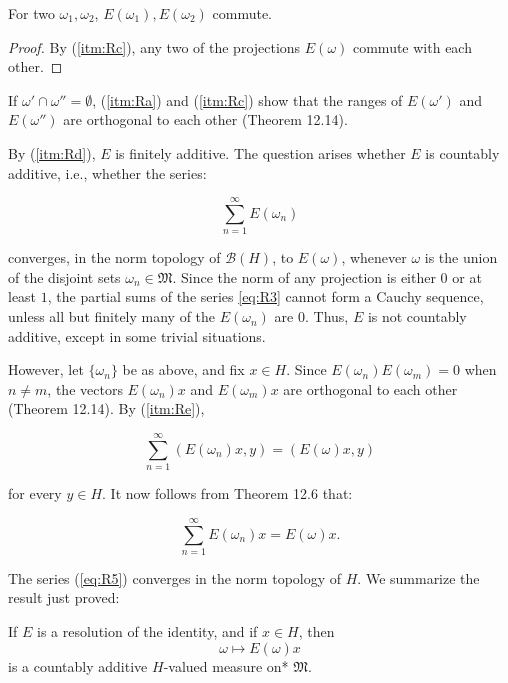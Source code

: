 \begin{lemma}
 For two $\omega_1, \omega_2$, \( E(\omega_1), E(\omega_2) \) commute.
\end{lemma}
\begin{proof}
 By (\ref{itm:Rc}), any two of the projections \( E(\omega) \) commute with each other.
\end{proof}


If \( \omega' \cap \omega'' = \emptyset \), (\ref{itm:Ra}) and (\ref{itm:Rc}) show that the ranges of \( E(\omega') \) and \( E(\omega'') \) are orthogonal to each other (Theorem 12.14).

By (\ref{itm:Rd}), \( E \) is finitely additive.
The question arises whether \( E \) is countably additive, i.e., whether the series:

\begin{equation}
  \label{eq:R3}
  \sum_{n=1}^{\infty} E(\omega_n)
\end{equation}

converges, in the norm topology of \( \mathcal{B}(H) \), to \( E(\omega) \), whenever \( \omega \) is the union of the disjoint sets \( \omega_n \in \mathfrak{M} \).
Since the norm of any projection is either $0$ or at least $1$, the partial sums of the series \ref{eq:R3} cannot form a Cauchy sequence, unless all but finitely many of the \( E(\omega_n) \) are 0.
Thus, \( E \) is not countably additive, except in some trivial situations.

However, let \( \{\omega_n\} \) be as above, and fix \( x \in H \).
Since \( E(\omega_n)E(\omega_m) = 0 \) when \( n \neq m \), the vectors \( E(\omega_n)x \) and \( E(\omega_m)x \) are orthogonal to each other (Theorem 12.14).
By (\ref{itm:Re}),

\begin{equation}
  \label{eq:R5}
  \sum_{n=1}^{\infty} (E(\omega_n)x, y) = (E(\omega)x, y)
\end{equation}

for every \( y \in H \).
It now follows from Theorem 12.6 that:

\[
  \sum_{n=1}^{\infty} E(\omega_n)x = E(\omega)x.
\]

The series (\eqref{eq:R5}) converges in the norm topology of \( H \).
We summarize the result just proved:

\begin{proposition}[12.18]
  If \( E \) is a resolution of the identity, and if \( x \in H \), then
  \[
    \omega \mapsto E(\omega)x
  \]
  is a countably additive \( H \)-valued measure on* \( \mathfrak{M} \).
\end{proposition}

